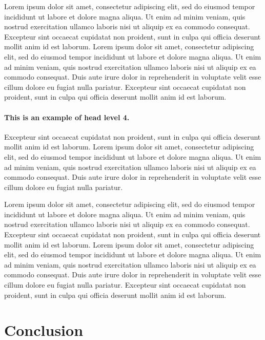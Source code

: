 \documentclass{sbc2025}%
\begin{document}
Lorem ipsum dolor sit amet, consectetur adipiscing elit, sed do eiusmod tempor incididunt ut labore et dolore magna aliqua. Ut enim ad minim veniam, quis nostrud exercitation ullamco laboris nisi ut aliquip ex ea commodo consequat. Excepteur sint occaecat cupidatat non proident, sunt in culpa qui officia deserunt mollit anim id est laborum. Lorem ipsum dolor sit amet, consectetur adipiscing elit, sed do eiusmod tempor incididunt ut labore et dolore magna aliqua. Ut enim ad minim veniam, quis nostrud exercitation ullamco laboris nisi ut aliquip ex ea commodo consequat. Duis aute irure dolor in reprehenderit in voluptate velit esse cillum dolore eu fugiat nulla pariatur. Excepteur sint occaecat cupidatat non proident, sunt in culpa qui officia deserunt mollit anim id est laborum.


\paragraph{This is an example of head level 4.}

Excepteur sint occaecat cupidatat non proident, sunt in culpa qui officia deserunt mollit anim id est laborum. Lorem ipsum dolor sit amet, consectetur adipiscing elit, sed do eiusmod tempor incididunt ut labore et dolore magna aliqua. Ut enim ad minim veniam, quis nostrud exercitation ullamco laboris nisi ut aliquip ex ea commodo consequat. Duis aute irure dolor in reprehenderit in voluptate velit esse cillum dolore eu fugiat nulla pariatur. 

Lorem ipsum dolor sit amet, consectetur adipiscing elit, sed do eiusmod tempor incididunt ut labore et dolore magna aliqua. Ut enim ad minim veniam, quis nostrud exercitation ullamco laboris nisi ut aliquip ex ea commodo consequat. Excepteur sint occaecat cupidatat non proident, sunt in culpa qui officia deserunt mollit anim id est laborum. Lorem ipsum dolor sit amet, consectetur adipiscing elit, sed do eiusmod tempor incididunt ut labore et dolore magna aliqua. Ut enim ad minim veniam, quis nostrud exercitation ullamco laboris nisi ut aliquip ex ea commodo consequat. Duis aute irure dolor in reprehenderit in voluptate velit esse cillum dolore eu fugiat nulla pariatur. Excepteur sint occaecat cupidatat non proident, sunt in culpa qui officia deserunt mollit anim id est laborum.

\section{Conclusion}
\end{document}
